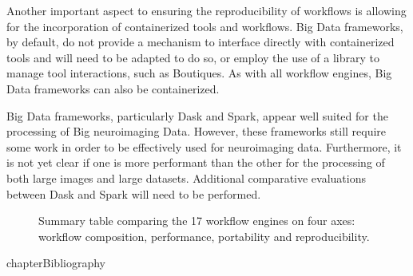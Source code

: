 \documentclass{report}
\begin{document}
        Another important aspect to ensuring the reproducibility of workflows
        is allowing for the incorporation of containerized tools and workflows.
        Big Data frameworks, by default, do not provide a mechanism to interface
        directly with containerized tools and will need to be adapted to do so,
        or employ the use of a library to manage tool interactions, such as 
        Boutiques. As with all workflow engines, Big Data frameworks can also 
        be containerized.

        Big Data frameworks, particularly Dask and Spark, appear well suited for
        the processing of Big neuroimaging Data. However, these frameworks still
        require some work in order to be effectively used for neuroimaging data.
        Furthermore, it is not yet clear if one is more performant than the other
        for the processing of both large images and large datasets. Additional
        comparative evaluations between Dask and Spark will need to be performed.

    \clearpage
    \begin{sidewaysfigure}[!p]
        \caption{Summary table comparing the 17 workflow engines on four axes:
        workflow composition, performance, portability and reproducibility.}
        
    \end{sidewaysfigure} 
        {chapter}{Bibliography} 
        
        
\end{document}
